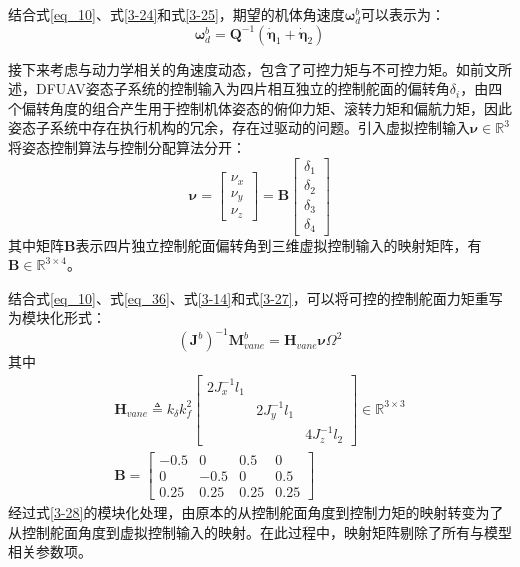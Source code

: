 结合式\eqref{eq_10}、式\eqref{3-24}和式\eqref{3-25}，期望的机体角速度$\boldsymbol\omega^{b}_d$可以表示为：
\begin{equation}
    \boldsymbol{\omega}^{b}_d=\boldsymbol{Q}^{-1}( \dot{\boldsymbol{\eta}}_1+ \dot{\boldsymbol{\eta}}_2)
    \label{3-26}
\end{equation}

接下来考虑与动力学相关的角速度动态，包含了可控力矩与不可控力矩。如前文所述，DFUAV姿态子系统的控制输入为四片相互独立的控制舵面的偏转角$\delta_i$，由四个偏转角度的组合产生用于控制机体姿态的俯仰力矩、滚转力矩和偏航力矩，因此姿态子系统中存在执行机构的冗余，存在过驱动的问题。引入虚拟控制输入$\boldsymbol{\nu}\in\mathbb{R}^3$将姿态控制算法与控制分配算法分开：
\begin{equation}
    \boldsymbol{\nu}=
    \begin{bmatrix}
    {\nu}_x \\ {\nu}_y \\ {\nu}_z
    \end{bmatrix}=\boldsymbol{B}
    \begin{bmatrix}
    \delta_1 \\ \delta_2 \\ \delta_3 \\ \delta_4
    \end{bmatrix}
    \label{3-27}
\end{equation}
其中矩阵$\boldsymbol{B}$表示四片独立控制舵面偏转角到三维虚拟控制输入的映射矩阵，有$\boldsymbol{B}\in\mathbb{R}^{3\times4}$。

结合式\eqref{eq_10}、式\eqref{eq_36}、式\eqref{3-14}和式\eqref{3-27}，可以将可控的控制舵面力矩重写为模块化形式：
\begin{equation}
    (\boldsymbol{J}^b)^{-1}\boldsymbol{M}_{vane}^b=\boldsymbol{H}_{vane}\boldsymbol{\nu}\Omega^2
    \label{3-28}
\end{equation}
其中
\begin{gather}
\left.\boldsymbol{H}_{vane}\triangleq k_{\delta}k_f^2\left[
    \begin{array}
    {ccc}2J_x^{-1}l_1 & & \\
        & 2J_y^{-1}l_1 & \\
        & & 4J_z^{-1}l_2
    \end{array}\right.\right]\in\mathbb{R}^{3\times3}
    \label{3-29}\\
    \boldsymbol{B}=
    \begin{bmatrix}
    -0.5 & 0 & 0.5 & 0 \\
    0 & -0.5 & 0 & 0.5 \\
    0.25 & 0.25 & 0.25 & 0.25
    \end{bmatrix}
    \label{3-30}
\end{gather}
经过式\eqref{3-28}的模块化处理，由原本的从控制舵面角度到控制力矩的映射转变为了从控制舵面角度到虚拟控制输入的映射。在此过程中，映射矩阵剔除了所有与模型相关参数项。

